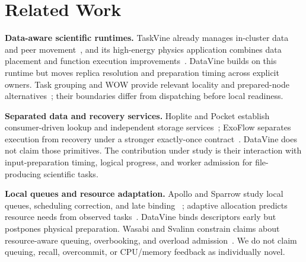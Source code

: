 \section{Related Work}
\textbf{Data-aware scientific runtimes.}
TaskVine already manages in-cluster data and peer movement~\cite{taskvine}, and
its high-energy physics application combines data placement and function
execution improvements~\cite{hep}. DataVine builds on this runtime but moves
replica resolution and preparation timing across explicit owners. Task grouping
and WOW provide relevant locality and prepared-node alternatives~\cite{grouping,wow};
their boundaries differ from dispatching before local readiness.

\textbf{Separated data and recovery services.}
Hoplite and Pocket establish consumer-driven lookup and independent storage
services~\cite{hoplite,pocket}; ExoFlow separates execution from recovery under
a stronger exactly-once contract~\cite{exoflow}. DataVine does not claim those
primitives. The contribution under study is their interaction with
input-preparation timing, logical progress, and worker admission for
file-producing scientific tasks.

\textbf{Local queues and resource adaptation.}
Apollo and Sparrow study local queues, scheduling correction, and late binding~
\cite{apollo,sparrow}; adaptive allocation predicts resource needs from
observed tasks~\cite{adaptive}. DataVine binds descriptors early but postpones
physical preparation. Wasabi and Svalinn constrain claims about resource-aware
queuing, overbooking, and overload admission~\cite{wasabi,svalinn}. We do not
claim queuing, recall, overcommit, or CPU/memory feedback as individually novel.
